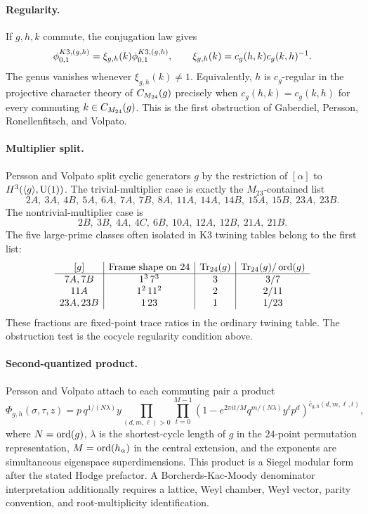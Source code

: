 \paragraph{Regularity.}
If \(g,h,k\) commute, the conjugation law gives
\[
  \phi^{K3,(g,h)}_{0,1}=\xi_{g,h}(k)\phi^{K3,(g,h)}_{0,1},
  \qquad
  \xi_{g,h}(k)=c_g(h,k)c_g(k,h)^{-1}.
\]
The genus vanishes whenever \(\xi_{g,h}(k)\neq 1\).  Equivalently,
\(h\) is \(c_g\)-regular in the projective character theory of
\(C_{M_{24}}(g)\) precisely when \(c_g(h,k)=c_g(k,h)\) for every commuting
\(k\in C_{M_{24}}(g)\).  This is the first obstruction of Gaberdiel,
Persson, Ronellenfitsch, and Volpato.

\paragraph{Multiplier split.}
Persson and Volpato split cyclic generators \(g\) by the restriction of
\([\alpha]\) to \(H^3(\langle g\rangle,\mathrm{U}(1))\).  The trivial-multiplier
case is exactly the \(M_{23}\)-contained list
\[
  2A,\ 3A,\ 4B,\ 5A,\ 6A,\ 7A,\ 7B,\ 8A,\ 11A,\ 14A,\ 14B,\
  15A,\ 15B,\ 23A,\ 23B.
\]
The nontrivial-multiplier case is
\[
  2B,\ 3B,\ 4A,\ 4C,\ 6B,\ 10A,\ 12A,\ 12B,\ 21A,\ 21B.
\]
The five large-prime classes often isolated in K3 twining tables belong
to the first list:
\[
\begin{array}{c|c|c|c}
[g] & \text{Frame shape on }24 & \operatorname{Tr}_{24}(g) & \operatorname{Tr}_{24}(g)/\operatorname{ord}(g)\\
\hline
7A,7B & 1^3\,7^3 & 3 & 3/7\\
11A & 1^2\,11^2 & 2 & 2/11\\
23A,23B & 1\,23 & 1 & 1/23
\end{array}
\]
These fractions are fixed-point trace ratios in the ordinary twining
table.  The obstruction test is the cocycle regularity condition above.

\paragraph{Second-quantized product.}
Persson and Volpato attach to each commuting pair a product
\[
  \Phi_{g,h}(\sigma,\tau,z)
  =
  p\,q^{1/(N\lambda)}y
  \prod_{(d,m,\ell)>0}\prod_{t=0}^{M-1}
  \left(1-e^{2\pi i t/M}q^{m/(N\lambda)}y^\ell p^d\right)^{
    \widehat c_{g,h}(d,m,\ell,t)},
\]
where \(N=\operatorname{ord}(g)\), \(\lambda\) is the shortest-cycle length of \(g\)
in the \(24\)-point permutation representation, \(M=\operatorname{ord}(h_\alpha)\)
in the central extension, and the exponents are simultaneous
eigenspace superdimensions.  This product is a Siegel modular form
after the stated Hodge prefactor.  A Borcherds-Kac-Moody
denominator interpretation additionally requires a lattice, Weyl
chamber, Weyl vector, parity convention, and root-multiplicity
identification.

